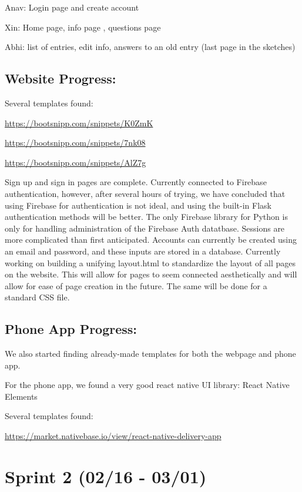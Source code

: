 \documentclass[]{book}
\begin{document}
Anav: Login page and create account

Xin: Home page, info page , questions page

Abhi: list of entries, edit info, answers to an old entry (last page in
the sketches)

\subsection{Website Progress:}\label{website-progress}

Several templates found:

\url{https://bootsnipp.com/snippets/K0ZmK}

\url{https://bootsnipp.com/snippets/7nk08}

\url{https://bootsnipp.com/snippets/AlZ7g}

Sign up and sign in pages are complete. Currently connected to Firebase
authentication, however, after several hours of trying, we have
concluded that using Firebase for authentication is not ideal, and using
the built-in Flask authentication methods will be better. The only
Firebase library for Python is only for handling administration of the
Firebase Auth datatbase. Sessions are more complicated than first
anticipated. Accounts can currently be created using an email and
password, and these inputs are stored in a database. Currently working
on building a unifying layout.html to standardize the layout of all
pages on the website. This will allow for pages to seem connected
aesthetically and will allow for ease of page creation in the future.
The same will be done for a standard CSS file.

\subsection{Phone App Progress:}\label{phone-app-progress}

We also started finding already-made templates for both the webpage and
phone app.

For the phone app, we found a very good react native UI library: React
Native Elements

Several templates found:

\url{https://market.nativebase.io/view/react-native-delivery-app}

\section{Sprint 2 (02/16 - 03/01)}\label{sprint-2-0216---0301}
\end{document}
